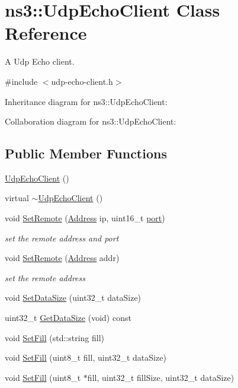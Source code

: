 \hypertarget{classns3_1_1UdpEchoClient}{}\section{ns3\+:\+:Udp\+Echo\+Client Class Reference}
\label{classns3_1_1UdpEchoClient}


A Udp Echo client.  




{\ttfamily \#include $<$udp-\/echo-\/client.\+h$>$}



Inheritance diagram for ns3\+:\+:Udp\+Echo\+Client\+:


Collaboration diagram for ns3\+:\+:Udp\+Echo\+Client\+:
\subsection*{Public Member Functions}
\begin{DoxyCompactItemize}
\item 
\hyperlink{classns3_1_1UdpEchoClient_ab3c277a6cd1da6cb63863957fde994b1}{Udp\+Echo\+Client} ()
\item 
virtual \hyperlink{classns3_1_1UdpEchoClient_a21e85a6498d74e1be15760c6a2e5a9c9}{$\sim$\+Udp\+Echo\+Client} ()
\item 
void \hyperlink{classns3_1_1UdpEchoClient_af520e84a0329477ab5ed2073832b8b4a}{Set\+Remote} (\hyperlink{classns3_1_1Address}{Address} ip, uint16\+\_\+t \hyperlink{visualizer-ideas_8txt_a21ff1c530daf8435e00048b7fc2c58e3}{port})
\begin{DoxyCompactList}\small\item\em set the remote address and port \end{DoxyCompactList}\item 
void \hyperlink{classns3_1_1UdpEchoClient_a15bb230a00594080bc8f77be44be2253}{Set\+Remote} (\hyperlink{classns3_1_1Address}{Address} addr)
\begin{DoxyCompactList}\small\item\em set the remote address \end{DoxyCompactList}\item 
void \hyperlink{classns3_1_1UdpEchoClient_ac5b4d4c9b8614bd947354fc1e8abe6dc}{Set\+Data\+Size} (uint32\+\_\+t data\+Size)
\item 
uint32\+\_\+t \hyperlink{classns3_1_1UdpEchoClient_aa9c16fff77e893ca4649a5c5b94adcbc}{Get\+Data\+Size} (void) const 
\item 
void \hyperlink{classns3_1_1UdpEchoClient_a03e61f7797db83425fc367b3e79b4005}{Set\+Fill} (std\+::string fill)
\item 
void \hyperlink{classns3_1_1UdpEchoClient_af08936de45c1cba718632606644b18d7}{Set\+Fill} (uint8\+\_\+t fill, uint32\+\_\+t data\+Size)
\item 
void \hyperlink{classns3_1_1UdpEchoClient_a1e1ce081c3e4a8c49a15c0a7ab962d1c}{Set\+Fill} (uint8\+\_\+t $\ast$fill, uint32\+\_\+t fill\+Size, uint32\+\_\+t data\+Size)
\end{DoxyCompactItemize}
